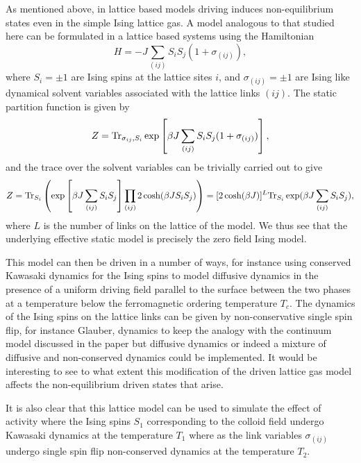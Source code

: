 As mentioned above, in lattice based models driving induces non-equilibrium states even in the simple Ising lattice gas. A model analogous to that studied here can be formulated in a lattice based systems using the Hamiltonian 
\begin{equation}
    H = -J\sum_{(ij)}S_i S_j (1+ \sigma_{(ij)}),
\end{equation}
where $S_i=\pm1$ are Ising spins at the lattice sites $i$, and $\sigma_{(ij)}=\pm 1$ are Ising like dynamical solvent variables associated with the lattice links $(ij)$. The static partition function is given by
\begin{equation}
    Z = {\rm Tr}_{\sigma_{ij},S_i} \exp\left[\beta J\sum_{(ij)}S_i S_j (1+ \sigma_{(ij)})\right],
\end{equation}
and the trace over the solvent variables can be trivially carried out to give
\begin{equation}
    Z = {\rm Tr}_{S_i}\left( \exp\left[\beta J\sum_{(ij)}S_i S_j \right]\prod_{(ij)}2\cosh(\beta JS_iS_j)\right )= [2\cosh(\beta J)]^L{\rm Tr}_{S_i}\exp(\beta J\sum_{(ij)}S_i S_j ),
\end{equation}
where $L$ is the number of links on the lattice of the model. We thus see that the underlying effective static model is precisely the zero field Ising model. 

This model can then be driven in a number of ways, for instance using conserved Kawasaki dynamics for the Ising spins to model diffusive dynamics in the presence of a uniform driving field parallel to the surface between the two phases at a temperature below the ferromagnetic ordering temperature $T_c$. The dynamics of the Ising spins on the lattice links can  be given by non-conservative single spin flip, for instance Glauber, dynamics to keep the analogy with the continuum model discussed in the paper but diffusive dynamics or indeed a mixture of diffusive and non-conserved dynamics 
could be implemented. It would be interesting to see to what extent this modification of the driven lattice gas model affects the non-equilibrium driven states that arise. 

It is also clear that this lattice model can be used to simulate the effect of activity where the Ising spins $S_1$ corresponding to the colloid field undergo  Kawasaki dynamics at the temperature $T_1$ where as the link variables $\sigma_{(ij)}$ undergo single spin flip non-conserved dynamics
at the temperature $T_2$.

